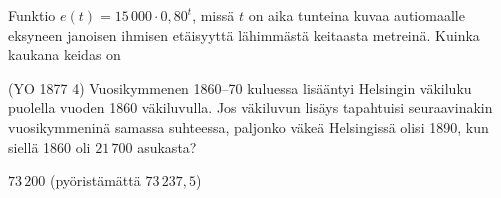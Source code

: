 \begin{tehtavasivu}
\begin{tehtava}
Funktio $ e(t)=15\,000\cdot 0,80^t$, missä $t$ on aika tunteina kuvaa autiomaalle eksyneen janoisen ihmisen etäisyyttä lähimmästä keitaasta metreinä. Kuinka kaukana keidas on 
\begin{vastaus}
\end{vastaus}
\end{tehtava}

\begin{tehtava}
(YO 1877 4) Vuosikymmenen 1860--70 kuluessa lisääntyi Helsingin väkiluku puolella vuoden 1860 väkiluvulla. Jos väkiluvun lisäys tapahtuisi seuraavinakin vuosikymmeninä samassa suhteessa, paljonko väkeä Helsingissä olisi 1890, kun siellä 1860 oli $21\,700$ asukasta? 
	\begin{vastaus}
	$73\,200$ (pyöristämättä $73\,237,5$)
	\end{vastaus}
\end{tehtava}

\end{tehtavasivu}
